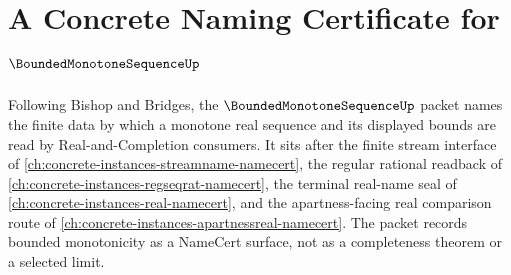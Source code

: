 \chapter{A Concrete Naming Certificate for $\BoundedMonotoneSequenceUp$}
\label{ch:concrete-instances-bounded-monotone-sequence-namecert}

Following Bishop and Bridges, the $\BoundedMonotoneSequenceUp$ packet names the finite data by which a monotone real sequence and its displayed bounds are read by Real-and-Completion consumers. It sits after the finite stream interface of \autoref{ch:concrete-instances-streamname-namecert}, the regular rational readback of \autoref{ch:concrete-instances-regseqrat-namecert}, the terminal real-name seal of \autoref{ch:concrete-instances-real-namecert}, and the apartness-facing real comparison route of \autoref{ch:concrete-instances-apartnessreal-namecert}. The packet records bounded monotonicity as a NameCert surface, not as a completeness theorem or a selected limit.

